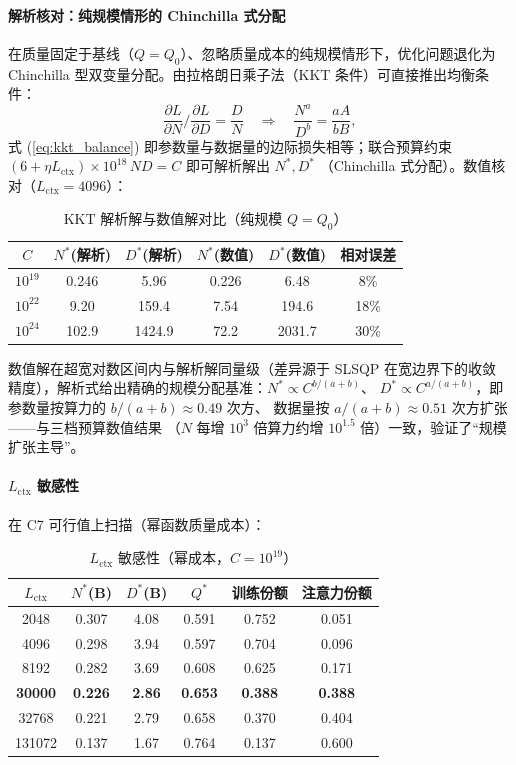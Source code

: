 \paragraph{解析核对：纯规模情形的 Chinchilla 式分配}

在质量固定于基线（$Q=Q_0$）、忽略质量成本的纯规模情形下，优化问题退化为
Chinchilla 型双变量分配。由拉格朗日乘子法（KKT 条件）可直接推出均衡条件：
\begin{equation}
\frac{\partial L}{\partial N}\Big/\frac{\partial L}{\partial D}
=\frac{D}{N}\quad\Longrightarrow\quad
\frac{N^{a}}{D^{b}}=\frac{aA}{bB},
\label{eq:kkt_balance}
\end{equation}
式 (\ref{eq:kkt_balance}) 即参数量与数据量的边际损失相等；联合预算约束
$(6+\eta L_{\text{ctx}})\times10^{18}\,ND=C$ 即可解析解出 $N^{*},D^{*}$
（Chinchilla 式分配）。数值核对（$L_{\text{ctx}}=4096$）：
\begin{table}[htbp]
\centering
\caption{KKT 解析解与数值解对比（纯规模 $Q=Q_0$）}
\begin{tabular}{c|cc|cc|c}
\toprule
$C$ & $N^{*}$(解析) & $D^{*}$(解析) & $N^{*}$(数值) & $D^{*}$(数值) & 相对误差 \\
\midrule
$10^{19}$ & 0.246 & 5.96 & 0.226 & 6.48 & 8\% \\
$10^{22}$ & 9.20 & 159.4 & 7.54 & 194.6 & 18\% \\
$10^{24}$ & 102.9 & 1424.9 & 72.2 & 2031.7 & 30\% \\
\bottomrule
\end{tabular}
\end{table}
数值解在超宽对数区间内与解析解同量级（差异源于 SLSQP 在宽边界下的收敛
精度），解析式给出精确的规模分配基准：$N^{*}\propto C^{b/(a+b)}$、
$D^{*}\propto C^{a/(a+b)}$，即参数量按算力的 $b/(a+b)\approx0.49$ 次方、
数据量按 $a/(a+b)\approx0.51$ 次方扩张——与三档预算数值结果
（$N$ 每增 $10^3$ 倍算力约增 $10^{1.5}$ 倍）一致，验证了``规模扩张主导''。

\paragraph{$L_{\text{ctx}}$ 敏感性}

在 C7 可行值上扫描（幂函数质量成本）：

\begin{table}[htbp]
\centering
\caption{$L_{\text{ctx}}$ 敏感性（幂成本，$C=10^{19}$）}
\begin{tabular}{c|ccccc}
\toprule
$L_{\text{ctx}}$ & $N^{*}$(B) & $D^{*}$(B) & $Q^{*}$ & 训练份额 & 注意力份额 \\
\midrule
2048 & 0.307 & 4.08 & 0.591 & 0.752 & 0.051 \\
4096 & 0.298 & 3.94 & 0.597 & 0.704 & 0.096 \\
8192 & 0.282 & 3.69 & 0.608 & 0.625 & 0.171 \\
\textbf{30000} & \textbf{0.226} & \textbf{2.86} & \textbf{0.653} & \textbf{0.388} & \textbf{0.388} \\
32768 & 0.221 & 2.79 & 0.658 & 0.370 & 0.404 \\
131072 & 0.137 & 1.67 & 0.764 & 0.137 & 0.600 \\
\bottomrule
\end{tabular}
\label{tab:p3_lctx}
\end{table}

